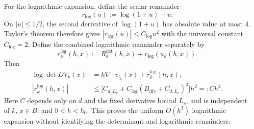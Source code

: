 \documentclass[12pt,a4paper,oneside]{book}
\begin{document}
For the logarithmic expansion, define the scalar remainder
\begin{equation*}
    r_{\log}(u):=\log(1+u)-u.
\end{equation*}
On $|u|\le1/2$, the second derivative of $\log(1+u)$ has absolute value at most $4$.
Taylor's theorem therefore gives $|r_{\log}(u)|\le C_{\log}u^2$ with the universal constant $C_{\log}=2$.
Define the combined logarithmic remainder separately by
\begin{equation*}
    r_k^{\log}(h,x):=R_k^{\det}(h,x)+r_{\log}(u_k(h,x)).
\end{equation*}
Then
\begin{equation*}
    \begin{aligned}
        \log\det DV_k(x)&=h\nabla\cdot v_{t_k}(x)+r_k^{\log}(h,x),\\
        |r_k^{\log}(h,x)|&\le\bigl[C_{d,L_v}+C_{\log}(B_{\mathrm{div}}+C_{d,L_v})^2\bigr]h^2=:Ch^2.
    \end{aligned}
\end{equation*}
Here $C$ depends only on $d$ and the fixed derivative bound $L_v$, and is independent of $k$, $x\in B$, and $0<h<h_0$.
This proves the uniform $O(h^2)$ logarithmic expansion without identifying the determinant and logarithmic remainders.

\clearpage
\backmatter

\clearpage
\printbibliography[heading=bibintoc,title={References}]
\end{document}
